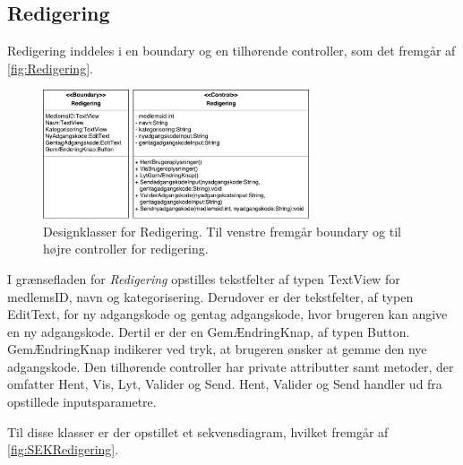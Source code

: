 \subsection*{Redigering}
Redigering inddeles i en boundary og en tilhørende controller, som det fremgår af \autoref{fig:Redigering}. 

\begin{figure} [H]
\centering
\includegraphics[width=0.7\textwidth]{figures/MVC/Redigering}
\caption{Designklasser for Redigering. Til venstre fremgår boundary og til højre controller for redigering.}
\label{fig:Redigering}
\end{figure}

\noindent
I grænsefladen for \textit{Redigering} opstilles tekstfelter af typen TextView for medlemsID, navn og kategorisering. Derudover er der tekstfelter, af typen EditText, for ny adgangskode og gentag adgangskode, hvor brugeren kan angive en ny adgangskode. Dertil er der en GemÆndringKnap, af typen Button. GemÆndringKnap indikerer ved tryk, at brugeren ønsker at gemme den nye adgangskode. 
Den tilhørende controller har private attributter samt metoder, der omfatter Hent, Vis, Lyt, Valider og Send. Hent, Valider og Send handler ud fra opstillede inputsparametre. 


Til disse klasser er der opstillet et sekvensdiagram, hvilket fremgår af \autoref{fig:SEKRedigering}.


